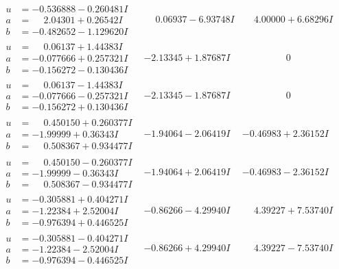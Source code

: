 \documentclass[1p]{elsarticle_modified}
\theoremstyle{definition}
\begin{document}
$$\begin{array}{c|c|c}
\begin{aligned}
u &= -0.536888 - 0.260481 I \\
a &= \phantom{-}2.04301 + 0.26542 I \\
b &= -0.482652 - 1.129620 I\end{aligned}
 & \phantom{-}0.06937 - 6.93748 I & \phantom{-}4.00000 + 6.68296 I \\ \hline\begin{aligned}
u &= \phantom{-}0.06137 + 1.44383 I \\
a &= -0.077666 + 0.257321 I \\
b &= -0.156272 - 0.130436 I\end{aligned}
 & -2.13345 + 1.87687 I & \phantom{-0.000000 } 0 \\ \hline\begin{aligned}
u &= \phantom{-}0.06137 - 1.44383 I \\
a &= -0.077666 - 0.257321 I \\
b &= -0.156272 + 0.130436 I\end{aligned}
 & -2.13345 - 1.87687 I & \phantom{-0.000000 } 0 \\ \hline\begin{aligned}
u &= \phantom{-}0.450150 + 0.260377 I \\
a &= -1.99999 + 0.36343 I \\
b &= \phantom{-}0.508367 + 0.934477 I\end{aligned}
 & -1.94064 - 2.06419 I & -0.46983 + 2.36152 I \\ \hline\begin{aligned}
u &= \phantom{-}0.450150 - 0.260377 I \\
a &= -1.99999 - 0.36343 I \\
b &= \phantom{-}0.508367 - 0.934477 I\end{aligned}
 & -1.94064 + 2.06419 I & -0.46983 - 2.36152 I \\ \hline\begin{aligned}
u &= -0.305881 + 0.404271 I \\
a &= -1.22384 + 2.52004 I \\
b &= -0.976394 + 0.446525 I\end{aligned}
 & -0.86266 - 4.29940 I & \phantom{-}4.39227 + 7.53740 I \\ \hline\begin{aligned}
u &= -0.305881 - 0.404271 I \\
a &= -1.22384 - 2.52004 I \\
b &= -0.976394 - 0.446525 I\end{aligned}
 & -0.86266 + 4.29940 I & \phantom{-}4.39227 - 7.53740 I \\ \hline\begin{aligned}

\end{aligned}
\end{array}$$
\end{document}
